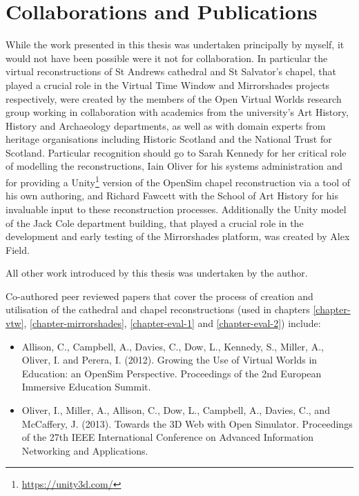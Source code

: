 \section{Collaborations and Publications}
\label{collaborations-and-publications}
While the work presented in this thesis was undertaken principally by myself, it would not have been possible were it not for collaboration. In particular the virtual reconstructions of St Andrews cathedral and St Salvator's chapel, that played a crucial role in the Virtual Time Window and Mirrorshades projects respectively, were created by the members of the Open Virtual Worlds research group working in collaboration with academics from the university's Art History, History and Archaeology departments, as well as with domain experts from heritage organisations including Historic Scotland and the National Trust for Scotland. Particular recognition should go to Sarah Kennedy for her critical role of modelling the reconstructions, Iain Oliver for his systems administration and for providing a Unity\footnote{\url{https://unity3d.com/}} version of the OpenSim chapel reconstruction via a tool of his own authoring, and Richard Fawcett with the School of Art History for his invaluable input to these reconstruction processes. Additionally the Unity model of the Jack Cole department building, that played a crucial role in the development and early testing of the Mirrorshades platform, was created by Alex Field.

All other work introduced by this thesis was undertaken by the author.


Co-authored peer reviewed papers that cover the process of creation and utilisation of the cathedral and chapel reconstructions (used in chapters \ref{chapter-vtw}, \ref{chapter-mirrorshades}, \ref{chapter-eval-1} and \ref{chapter-eval-2}) include:

\begin{itemize}

	\item [1.] Allison, C., Campbell, A., Davies, C., Dow, L., Kennedy, S., Miller, A., Oliver, I. and Perera, I. (2012). Growing the Use of Virtual Worlds in Education: an OpenSim Perspective. Proceedings of the 2nd European Immersive Education Summit.
	
	\item [2.] Oliver, I., Miller, A., Allison, C., Dow, L., Campbell, A., Davies, C., and McCaffery, J. (2013). Towards the 3D Web with Open Simulator. Proceedings of the 27th IEEE International Conference on Advanced Information Networking and Applications.

\end{itemize}

